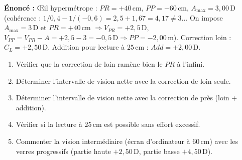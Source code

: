 \documentclass[11pt]{article}
\begin{document}
\begin{exoresolu}
\textbf{Énoncé :} Œil hypermétrope : $PR = +40\,\text{cm}$, $PP = -60\,\text{cm}$, $A_{\text{max}} = 3,00\,\text{D}$ (cohérence : $1/0,4 - 1/(-0,6) = 2,5 + 1,67 = 4,17 \neq 3$... On impose $A_{\text{max}}=3\,\text{D}$ et $PR=+40\,\text{cm}$ $\Rightarrow V_{PR}=+2,5\,\text{D}$, $V_{PP}=V_{PR}-A = +2,5 - 3 = -0,5\,\text{D} \Rightarrow PP = -2,00\,\text{m}$).
Correction loin : $C_L = +2,50\,\text{D}$. Addition pour lecture à $25\,\text{cm}$ : $Add = +2,00\,\text{D}$.
\begin{enumerate}
    \item Vérifier que la correction de loin ramène bien le $PR$ à l'infini.
    \item Déterminer l'intervalle de vision nette avec la correction de loin seule.
    \item Déterminer l'intervalle de vision nette avec la correction de près (loin + addition).
    \item Vérifier si la lecture à $25\,\text{cm}$ est possible sans effort excessif.
    \item Commenter la vision intermédiaire (écran d'ordinateur à $60\,\text{cm}$) avec les verres progressifs (partie haute $+2,50\,\text{D}$, partie basse $+4,50\,\text{D}$).
\end{enumerate}


\end{exoresolu}
\end{document}
